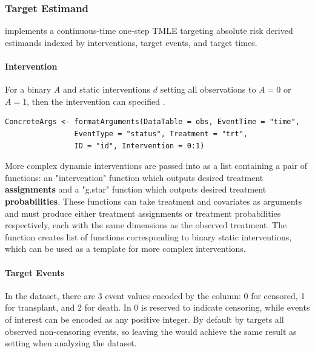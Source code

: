 \documentclass{report}
\newcommand{\1}{\ensuremath{\mathbf{1}}}
\begin{document}
\subsubsection{Target Estimand}
\label{Estimand}
 implements a continuous-time one-step TMLE targeting absolute risk derived estimands indexed by  interventions, target events, and target times.  

\paragraph{Intervention}
\label{TreatmentRegime}
For a binary \(A\) and static interventions \(d\) setting all observations to \(A=0\) or \(A=1\), then the intervention can specified .
\begin{lstlisting}
ConcreteArgs <- formatArguments(DataTable = obs, EventTime = "time",
				EventType = "status", Treatment = "trt",
				ID = "id", Intervention = 0:1)
\end{lstlisting}

More complex dynamic interventions are passed into  as a list containing a pair of functions: an "intervention" function which outputs desired treatment \textbf{\textbf{assignments}} and a "g.star" function which outputs desired treatment \textbf{\textbf{probabilities}}. These functions can take treatment and covariates as arguments and must produce either treatment assignments or treatment probabilities respectively, each with the same dimensions as the observed treatment. The function  creates list of functions corresponding to binary static interventions, which can be used as a template for more complex interventions.

\paragraph{Target Events}
\label{TargetEvent}
In the  dataset, there are 3 event values encoded by the  column: 0 for censored, 1 for transplant, and 2 for death. In  0 is reserved to indicate censoring, while events of interest can be encoded as any positive integer. By default  by targets all observed non-censoring events, so leaving the  would achieve the same result as setting  when analyzing the  dataset.
\end{document}
